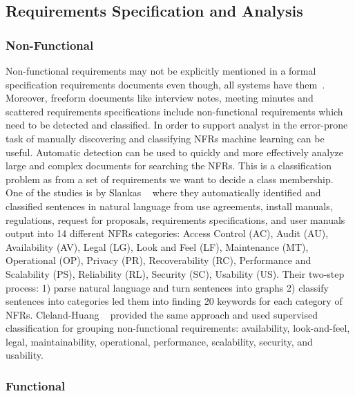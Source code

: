 \subsection{Requirements Specification and Analysis}

\subsubsection{Non-Functional}

Non-functional requirements may not be explicitly mentioned in a formal specification requirements documents even though, all systems have them~\cite{Slankas:2013}. Moreover, freeform documents like interview notes, meeting minutes and scattered requirements specifications include non-functional requirements which need to be detected and classified. In order to support analyst in the error-prone task of manually discovering and classifying NFRs machine learning can be useful. Automatic detection can be used to quickly and more effectively analyze large and complex documents for searching the NFRs\cite{Cleland-Huang2007}. This is a classification problem as from a set of requirements we want to decide a class membership. \\

One of the studies is by Slankas \etal~\cite{Slankas:2013} where they automatically identified and classified sentences in natural language from use agreements, install manuals, regulations, request for proposals, requirements specifications, and user manuals output into 14 different NFRs categories: Access Control (AC), Audit (AU), Availability (AV), Legal (LG), Look and Feel (LF), Maintenance (MT), Operational (OP), Privacy (PR), Recoverability (RC), Performance and Scalability (PS), Reliability (RL), Security (SC), Usability (US). Their two-step process: 1) parse natural language and turn sentences into graphs 2) classify sentences into categories led them into finding 20 keywords for each category of NFRs. \newline
Cleland-Huang \etal~\cite{Cleland-Huang2007} provided the same approach and used supervised classification for grouping non-functional requirements: availability, look-and-feel, legal, maintainability, operational, performance, scalability, security, and usability.

\subsubsection{Functional}

